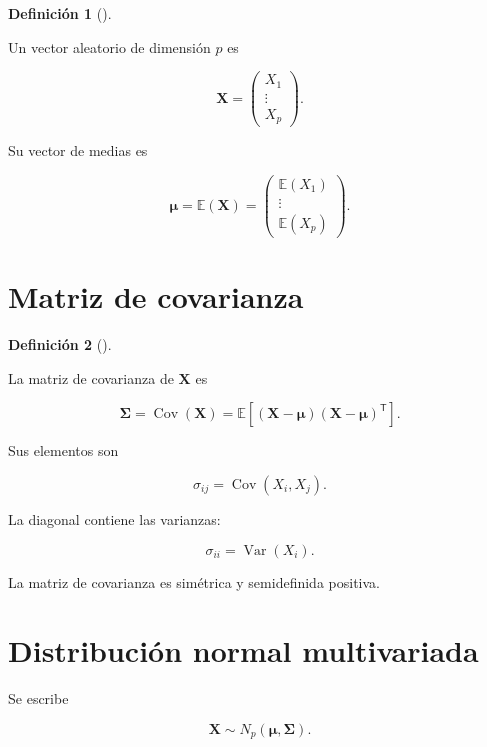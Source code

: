 \documentclass[
  spanish,
  11pt,
  letterpaper,
  DIV=11,
  numbers=noendperiod]{scrreprt}
\theoremstyle{definition}
\newtheorem{definition}{Definición}[chapter]
\theoremstyle{plain}
\theoremstyle{definition}
\theoremstyle{remark}
\begin{document}
\begin{definition}[]\protect\hypertarget{def-vector-aleatorio}{}\label{def-vector-aleatorio}

Un vector aleatorio de dimensión \(p\) es

\[
\mathbf{X}
=
\begin{pmatrix}
X_1\\
\vdots\\
X_p
\end{pmatrix}.
\]

\end{definition}

Su vector de medias es

\[
\boldsymbol{\mu}
=
\mathbb{E}(\mathbf{X})
=
\begin{pmatrix}
\mathbb{E}(X_1)\\
\vdots\\
\mathbb{E}(X_p)
\end{pmatrix}.
\]

\section{Matriz de covarianza}\label{matriz-de-covarianza-1}

\begin{definition}[]\protect\hypertarget{def-matriz-covarianza}{}\label{def-matriz-covarianza}

La matriz de covarianza de \(\mathbf{X}\) es

\[
\boldsymbol{\Sigma}
=
\operatorname{Cov}(\mathbf{X})
=
\mathbb{E}
\left[
(\mathbf{X}-\boldsymbol{\mu})
(\mathbf{X}-\boldsymbol{\mu})^{\mathsf T}
\right].
\]

\end{definition}

Sus elementos son

\[
\sigma_{ij}
=
\operatorname{Cov}(X_i,X_j).
\]

La diagonal contiene las varianzas:

\[
\sigma_{ii}
=
\operatorname{Var}(X_i).
\]

La matriz de covarianza es simétrica y semidefinida positiva.

\section{Distribución normal
multivariada}\label{distribuciuxf3n-normal-multivariada}

Se escribe

\[
\mathbf{X}
\sim
N_p(\boldsymbol{\mu},\boldsymbol{\Sigma}).
\]
\end{document}
